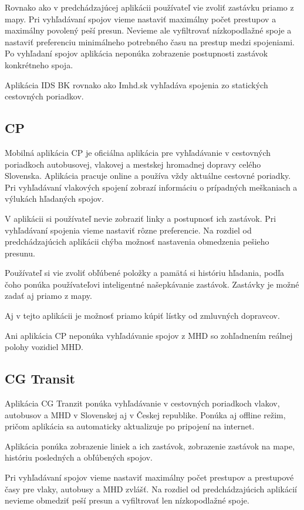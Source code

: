 Rovnako ako v predchádzajúcej aplikácii používateľ vie zvoliť zastávku priamo z mapy. Pri vyhľadávaní spojov vieme nastaviť maximálny počet prestupov a maximálny povolený peší presun. Nevieme ale vyfiltrovať nízkopodlažné spoje a nastaviť preferenciu minimálneho potrebného času na prestup medzi spojeniami. Po vyhľadaní spojov aplikácia neponúka zobrazenie postupnosti zastávok konkrétneho spoja.

Aplikácia IDS BK rovnako ako Imhd.sk vyhľadáva spojenia zo statických cestovných poriadkov.  

\subsection{CP}
Mobilná aplikácia CP je oficiálna aplikácia pre vyhľadávanie v cestovných poriadkoch autobusovej, vlakovej a mestskej hromadnej dopravy celého Slovenska. Aplikácia pracuje online a používa vždy aktuálne cestovné poriadky. Pri vyhľadávaní vlakových spojení zobrazí informáciu o prípadných meškaniach a výlukách hľadaných spojov. 

V aplikácii si používateľ nevie zobraziť linky a postupnosť ich zastávok. Pri vyhľadávaní spojenia vieme nastaviť rôzne preferencie. Na rozdiel od predchádzajúcich aplikácii chýba možnosť nastavenia obmedzenia pešieho presunu.

Používateľ si vie zvoliť obľúbené položky a pamätá si históriu hľadania, podľa čoho ponúka používateľovi inteligentné našepkávanie zastávok. Zastávky je možné zadať aj priamo z mapy. 

Aj v tejto aplikácii je možnosť priamo kúpiť lístky od zmluvných dopravcov. 

Ani aplikácia CP neponúka vyhľadávanie spojov z MHD so zohľadnením reálnej polohy vozidiel MHD.

\subsection{CG Transit}
Aplikácia CG Tranzit ponúka vyhľadávanie v cestovných poriadkoch vlakov, autobusov a MHD v Slovenskej aj v Českej republike. Ponúka aj offline režim, pričom aplikácia sa automaticky aktualizuje po pripojení na internet. 

Aplikácia ponúka zobrazenie liniek a ich zastávok, zobrazenie zastávok na mape, históriu posledných a obľúbených spojov.

Pri vyhľadávaní spojov vieme nastaviť maximálny počet prestupov a prestupové časy pre vlaky, autobusy a MHD zvlášť. Na rozdiel od predchádzajúcich aplikácií nevieme obmedziť peší presun a vyfiltrovať len nízkopodlažné spoje.


